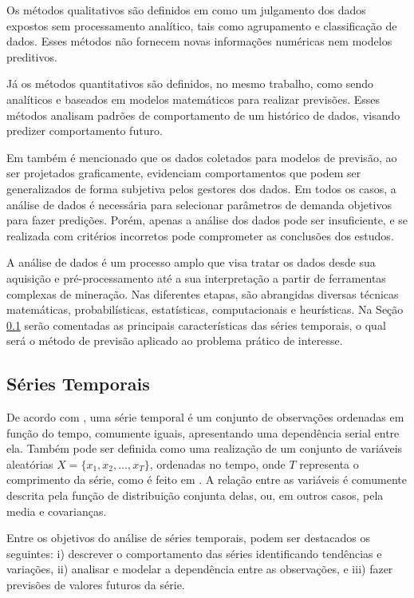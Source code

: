         Os métodos qualitativos são definidos em \cite{Junior2007} como um julgamento dos dados expostos sem processamento analítico, tais como agrupamento e classificação de dados. Esses métodos não fornecem novas informações numéricas nem  modelos preditivos.
        
        Já os métodos quantitativos são definidos, no mesmo trabalho, como sendo analíticos e baseados em  modelos matemáticos para realizar previsões. Esses métodos analisam padrões de comportamento de um histórico de dados, visando predizer comportamento futuro.
         
        Em  também é mencionado que os dados coletados para modelos de previsão, ao ser projetados graficamente, evidenciam comportamentos que podem ser generalizados de forma subjetiva pelos gestores dos dados. Em todos os casos, a análise de dados é necessária para selecionar parâmetros de demanda objetivos para fazer predições. Porém, apenas a análise dos dados pode ser insuficiente,  e se realizada com critérios incorretos pode comprometer as conclusões dos estudos. 
        
        A análise de dados é um processo amplo que visa tratar os dados desde sua aquisição e pré-processamento até a sua interpretação a partir de ferramentas complexas de mineração. Nas diferentes etapas, são abrangidas diversas técnicas matemáticas, probabilísticas, estatísticas, computacionais e heurísticas.  Na Seção \ref{sec: timeseries} serão comentadas as principais características das séries temporais, o qual será o método de previsão aplicado ao problema prático de interesse. 
    
        \subsection{Séries Temporais} \label{sec: timeseries} 
         
            De acordo com  , uma série temporal é um conjunto de observações ordenadas em função do tempo, comumente iguais, apresentando uma dependência serial entre ela. Também pode ser definida como uma realização de um conjunto de variáveis aleatórias $ X=\{x_1, x_2, \dots, x_T\}$, ordenadas no tempo, onde  $T$ representa o comprimento da série, como é feito em \cite{defts}. A relação entre as variáveis é comumente descrita pela função de distribuição conjunta delas, ou, em outros casos, pela media e covarianças. 
            
            Entre os objetivos do análise de séries temporais, podem ser destacados os seguintes: i) descrever o comportamento das séries identificando tendências e variações, ii) analisar e modelar  a dependência entre as observações, e iii) fazer previsões de valores futuros da série. 
            

